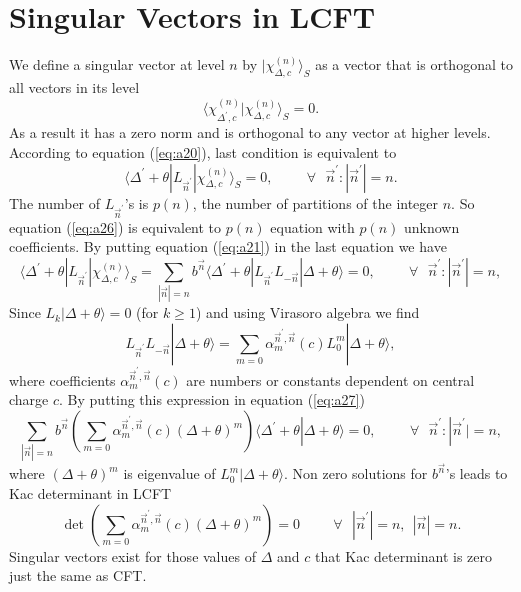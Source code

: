 \documentclass[a4paper,11pt]{article}
\begin{document}
\section{Singular Vectors in LCFT}
We define a singular vector at level $n$ by
$|\chi^{(n)}_{\Delta,c}\rangle_{S}$ as a vector that is
orthogonal to all vectors in its level
\begin{equation}\label{eq:a25}
\langle\chi^{(n)}_{\Delta^{\prime},c}|\chi^{(n)}_{\Delta,c}\rangle_{S}=0.
\end{equation}
As a result it has a zero norm and is orthogonal to any vector at
higher levels. According to equation (\ref{eq:a20}), last
condition is equivalent to
\begin{equation}\label{eq:a26}
\langle
\Delta^{'}+\theta|L_{\vec{n}^{'}}|\chi^{(n)}_{\Delta,c}\rangle_{S}=0,\hspace{1cm}\forall\:\:\:\vec{n}^{'}:
|\vec{n}^{'}|=n.
\end{equation}
The number of $L_{\vec{n}^{'}}$'s is $p(n)$, the number of
partitions of the integer $n$. So equation (\ref{eq:a26}) is
equivalent to $p(n)$ equation with $p(n)$ unknown coefficients. By
putting equation (\ref{eq:a21}) in the last equation we have
\begin{equation}\label{eq:a27}
\langle
\Delta^{'}+\theta|L_{\vec{n}^{'}}|\chi^{(n)}_{\Delta,c}\rangle_{S}=\sum_{|\vec{n}|=n}
b^{\vec{n}}\langle
\Delta^{'}+\theta|L_{\vec{n}^{'}}L_{-\vec{n}}|\Delta+\theta\rangle=0,
\hspace{1cm}\forall\:\:\:\vec{n}^{'}: |\vec{n}^{'}|=n,
\end{equation}
Since $L_{k}|\Delta+\theta\rangle=0$ (for $k\geq1$) and using
Virasoro algebra we find
\begin{equation}\label{eq:a28}
L_{\vec{n}^{'}}L_{-\vec{n}}|\Delta+\theta\rangle=
\sum_{m=0}\alpha_{m}^{\vec{n}^{'},\vec{n}}(c)L_{0}^{m}|\Delta+\theta\rangle,
\end{equation}
where coefficients $\alpha_{m}^{\vec{n}^{'},\vec{n}}(c)$ are
numbers or constants dependent on central charge $c$. By putting
this expression in equation (\ref{eq:a27})
\begin{equation}\label{eq:a29}
\sum_{|\vec{n}|=n}b^{\vec{n}}\left(
\sum_{m=0}\alpha_{m}^{\vec{n}^{'},\vec{n}}(c)(\Delta+\theta)^{m}\right)
\langle
\Delta^{'}+\theta|\Delta+\theta\rangle=0,\hspace{1cm}\forall\:\:\:\vec{n}^{'}:
|\vec{n}^{'}|=n,
\end{equation}
where $(\Delta+\theta)^{m}$ is eigenvalue of
$L_{0}^{m}|\Delta+\theta\rangle$. Non zero solutions for
$b^{\vec{n}}$'s leads to Kac determinant in LCFT
\begin{equation}\label{eq:a30}
\det\left(
\sum_{m=0}\alpha_{m}^{\vec{n}^{'},\vec{n}}(c)(\Delta+\theta)^{m}\right)=0\hspace{1cm}\forall\:\:\:|\vec{n}^{'}|=n,\:\:
|\vec{n}|=n.
\end{equation}
Singular vectors exist for those values of $\Delta$ and $c$ that
Kac determinant is zero just the same as CFT.
\end{document}

